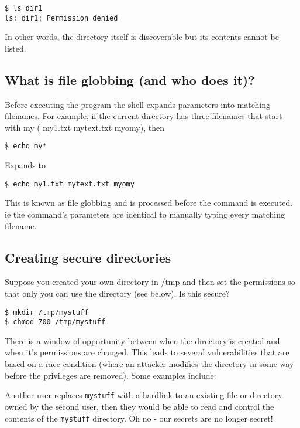 \begin{verbatim}
$ ls dir1
ls: dir1: Permission denied
\end{verbatim}

In other words, the directory itself is discoverable but its contents
cannot be listed.

\subsection{What is file globbing (and who does
it)?}\label{what-is-file-globbing-and-who-does-it}

Before executing the program the shell expands parameters into matching
filenames. For example, if the current directory has three filenames
that start with my ( my1.txt mytext.txt myomy), then

\begin{verbatim}
$ echo my*
\end{verbatim}

Expands to

\begin{verbatim}
$ echo my1.txt mytext.txt myomy
\end{verbatim}

This is known as file globbing and is processed before the command is
executed.\\ie the command's parameters are identical to manually typing
every matching filename.

\subsection{Creating secure
directories}\label{creating-secure-directories}

Suppose you created your own directory in /tmp and then set the
permissions so that only you can use the directory (see below). Is this
secure?

\begin{verbatim}
$ mkdir /tmp/mystuff
$ chmod 700 /tmp/mystuff
\end{verbatim}

There is a window of opportunity between when the directory is created
and when it's permissions are changed. This leads to several
vulnerabilities that are based on a race condition (where an attacker
modifies the directory in some way before the privileges are removed).
Some examples include:

Another user replaces \texttt{mystuff} with a hardlink to an existing
file or directory owned by the second user, then they would be able to
read and control the contents of the \texttt{mystuff} directory. Oh no -
our secrets are no longer secret!


